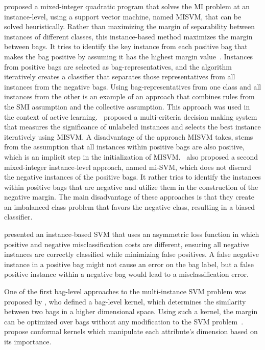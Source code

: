 \documentclass[preprint,12pt]{elsarticle}
\begin{document}
\citet{Andrews2002} proposed a mixed-integer quadratic program that solves the MI problem at an instance-level, using a support vector machine, named MISVM, that can be solved heuristically. Rather than maximizing the margin of separability between instances of different classes, this instance-based method maximizes the margin between bags. It tries to identify the key instance from each positive bag that makes the bag positive by assuming it has the highest margin value~\citep{Herrera2016}. Instances from positive bags are selected as bag-representatives, and the algorithm iteratively creates a classifier that separates those representatives from all instances from the negative bags. Using bag-representatives from one class and all instances from the other is an example of an approach that combines rules from the SMI assumption and the collective assumption. This approach was used in the context of active learning.~\citet{Wang20143106} proposed a multi-criteria decision making system that measures the significance of unlabeled instances and selects the best instance iteratively using MISVM. A disadvantage of the approach MISVM takes, stems from the assumption that all instances within positive bags are also positive, which is an implicit step in the initialization of MISVM.~\citet{Andrews2002} also proposed a second mixed-integer instance-level approach, named mi-SVM, which does not discard the negative instances of the positive bags. It rather tries to identify the instances within positive bags that are negative and utilize them in the construction of the negative margin. The main disadvantage of these approaches is that they create an imbalanced class problem that favors the negative class, resulting in a biased classifier.

\citet{Yang2006} presented an instance-based SVM that uses an asymmetric loss function in which positive and negative misclassification costs are different, ensuring all negative instances are correctly classified while minimizing false positives. A false negative instance in a positive bag might not cause an error on the bag label, but a false positive instance within a negative bag would lead to a misclassification error.

One of the first bag-level approaches to the multi-instance SVM problem was proposed by \citet{Smola2002}, who defined a bag-level kernel, which determines the similarity between two bags in a higher dimensional space. Using such a kernel, the margin can be optimized over bags without any modification to the SVM problem~\citep{Herrera2016}.~\citet{Blaschko2006} propose conformal kernels which manipulate each attribute's dimension based on its importance. 
\end{document}
